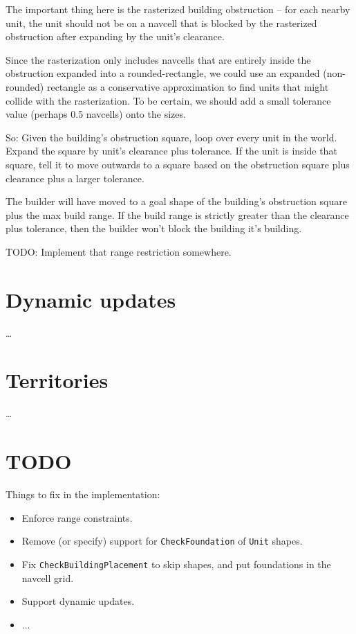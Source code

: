 \documentclass[a4paper,10pt]{article}
\begin{document}
The important thing here is the rasterized building obstruction --
for each nearby unit, the unit should not be on a navcell that is blocked
by the rasterized obstruction after expanding by the unit's clearance.

Since the rasterization only includes navcells that are entirely inside the
obstruction expanded into a rounded-rectangle,
we could use an expanded (non-rounded) rectangle as a conservative approximation
to find units that might collide with the rasterization.
To be certain, we should add a small tolerance value (perhaps 0.5 navcells) onto the sizes.

So: Given the building's obstruction square, loop over every unit in the world.
Expand the square by unit's clearance plus tolerance. If the unit is inside that
square, tell it to move outwards to a square based on the obstruction square plus
clearance plus a larger tolerance.

The builder will have moved to a goal shape of the building's obstruction square
plus the max build range.
If the build range is strictly greater than the clearance plus tolerance,
then the builder won't block the building it's building.

TODO: Implement that range restriction somewhere.

\section{Dynamic updates}

\ldots

\section{Territories}

\ldots

\section{TODO}

Things to fix in the implementation:
\begin{itemize}
 \item Enforce range constraints.
 \item Remove (or specify) support for \texttt{CheckFoundation} of \texttt{Unit} shapes.
 \item Fix \texttt{CheckBuildingPlacement} to skip shapes, and put foundations in the navcell grid.
 \item Support dynamic updates.
 \item ...
\end{itemize}
\end{document}
